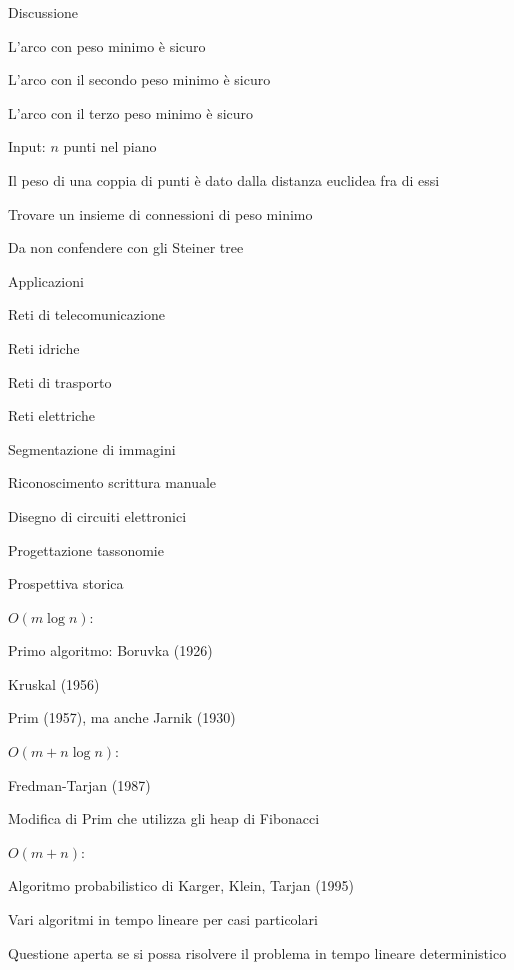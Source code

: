 \begin{frame}{Discussione}

\BI
\item L’arco con peso minimo è sicuro
\item L’arco con il secondo peso minimo è sicuro
\item L’arco con il terzo peso minimo è sicuro
\EI

\bigskip
{}
\BI
\item Input: $n$ punti nel piano 
\item Il peso di una coppia di punti è dato dalla distanza euclidea fra di essi
\item Trovare un insieme di connessioni di peso minimo
\item Da non confendere con gli \alert{Steiner tree}
\EI

\end{frame}

\begin{frame}{Applicazioni}

\BI
\item Reti di telecomunicazione
\item Reti idriche
\item Reti di trasporto
\item Reti elettriche
\EI

\bigskip
{}
\BI
\item Segmentazione di immagini
\item Riconoscimento scrittura manuale
\item Disegno di circuiti elettronici
\item Progettazione tassonomie
\EI

\end{frame}


\begin{frame}{Prospettiva storica}
	
\BIL
\item \alert{$O(m \log n)$}:
	\BI
	\item Primo algoritmo: Boruvka (1926)
	\item Kruskal (1956)
	\item Prim (1957), ma anche Jarnik (1930)
	\EI
\item \alert{$O(m + n \log n)$}:
	\BI
	\item Fredman-Tarjan (1987)
	\item Modifica di Prim che utilizza gli heap di Fibonacci
	\EI
\item \alert{$O(m+n)$}:	
	\BI
	\item Algoritmo probabilistico di Karger, Klein, Tarjan (1995)
	\item Vari algoritmi in tempo lineare per casi particolari
	\item Questione aperta se si possa risolvere il problema in tempo
	  lineare deterministico
	\EI
\EIL

	
\end{frame}




